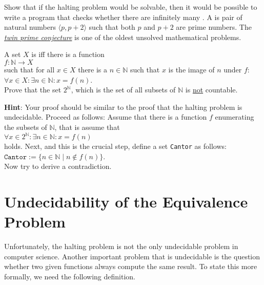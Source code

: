 \exerciseEng
Show that if the halting problem would be solvable, then it would be possible to write a program that checks
whether there are infinitely many .  
A  is pair of natural numbers
$\langle p, p + 2 \rangle$ such that both $p$ and $p+2$ are prime numbers.  
The \href{http://en.wikipedia.org/wiki/Twin_prime_conjecture}{\emph{twin prime conjecture}} is one
of the oldest unsolved mathematical problems.  \eox

\exerciseEng
A set $X$ is   iff there is a function 
\\[0.2cm]
\hspace*{1.3cm}
 $f: \mathbb{N} \rightarrow X$ 
\\[0.2cm]
such that for all $x\in X$ there is a $n \in \mathbb{N}$ such that $x$ is the image of
$n$ under $f$: 
\\[0.2cm]
\hspace*{1.3cm} $\forall x \in X: \exists n \in \mathbb{N}: x = f(n)$.
\\[0.2cm]
Prove that the set $2^\mathbb{N}$, which is the set of all subsets of $\mathbb{N}$ is \underline{not} countable. 

\vspace*{0.2cm}

\noindent
\textbf{Hint}:  Your proof should be similar to the proof that the halting problem is undecidable. 
Proceed as follows:
Assume that there is a function $f$ enumerating the subsets of $\mathbb{N}$, that is assume that 
\\[0.2cm]
\hspace*{1.3cm}
$\forall x \in 2^\mathbb{N}: \exists n \in \mathbb{N}: x = f(n)$
\\[0.2cm]
holds.  Next, and this is the crucial step, define a set \texttt{Cantor} as follows:
\\[0.2cm]
\hspace*{1.3cm} $\mathtt{Cantor} := \bigl\{ n \in \mathbb{N} \mid n \notin f(n) \bigr\}$.
\\[0.2cm]
Now try to derive a contradiction.  \eox



\section[The Equivalence Problem]{Undecidability of the Equivalence Problem}
Unfortunately, the halting problem is not the only undecidable problem in computer science.  Another
important problem that is undecidable is the question whether two given functions always compute the
same result.  To state this more formally, we need the following definition.


